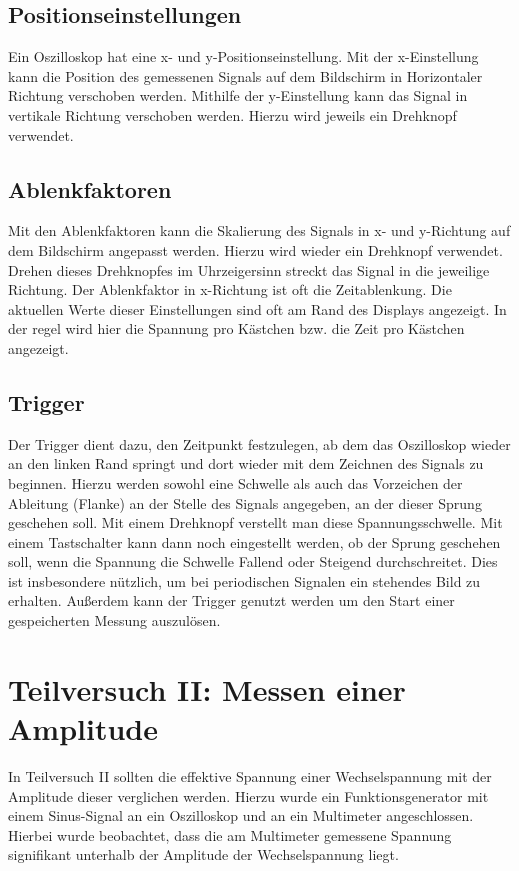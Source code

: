 \documentclass{report}
\begin{document}
\subsection{Positionseinstellungen}
Ein Oszilloskop hat eine x- und y-Positionseinstellung. Mit der x-Einstellung kann die Position des gemessenen 
Signals auf dem Bildschirm in Horizontaler Richtung verschoben werden. Mithilfe der y-Einstellung kann das Signal in vertikale
Richtung verschoben werden. Hierzu wird jeweils ein Drehknopf verwendet.
\subsection{Ablenkfaktoren}
Mit den Ablenkfaktoren kann die Skalierung des Signals in x- und y-Richtung auf dem Bildschirm angepasst werden. Hierzu wird
wieder ein Drehknopf verwendet. Drehen dieses Drehknopfes im Uhrzeigersinn streckt das Signal in die jeweilige Richtung. 
Der Ablenkfaktor in x-Richtung ist oft die Zeitablenkung.
Die aktuellen Werte dieser Einstellungen sind oft am Rand des Displays angezeigt. In der regel wird hier die Spannung pro Kästchen
bzw. die Zeit pro Kästchen angezeigt.
\subsection{Trigger}
Der Trigger dient dazu, den Zeitpunkt festzulegen, ab dem das Oszilloskop wieder an den linken Rand springt und dort wieder 
mit dem \glqq Zeichnen \grqq des Signals zu beginnen. Hierzu werden sowohl eine Schwelle als auch das Vorzeichen der Ableitung (Flanke)
an der Stelle des Signals angegeben, an der dieser Sprung geschehen soll. Mit einem Drehknopf verstellt man diese Spannungsschwelle. 
Mit einem Tastschalter kann dann noch eingestellt werden, ob der Sprung geschehen soll, wenn die Spannung die Schwelle 
Fallend oder Steigend durchschreitet.
Dies ist insbesondere nützlich, um bei periodischen Signalen ein stehendes Bild zu erhalten. Außerdem kann der Trigger genutzt 
werden um den Start einer gespeicherten Messung auszulösen. 

\newpage
\section{Teilversuch II: Messen einer Amplitude}
In Teilversuch II sollten die effektive Spannung einer Wechselspannung mit der Amplitude dieser verglichen werden. 
Hierzu wurde ein Funktionsgenerator mit einem Sinus-Signal an ein Oszilloskop und an ein Multimeter angeschlossen.
Hierbei wurde beobachtet, dass die am Multimeter gemessene Spannung signifikant unterhalb der Amplitude der Wechselspannung 
liegt.
\end{document}
